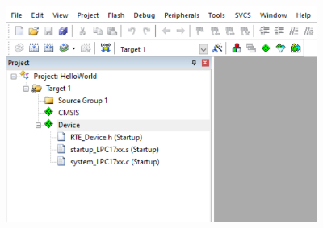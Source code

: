   \begin{minipage}{\linewidth}
    \centering
    \includegraphics[width=4in]{figure/uv5/IDE_default_proj}
    \label{fig_ide_default_proj}
  \end{minipage}

